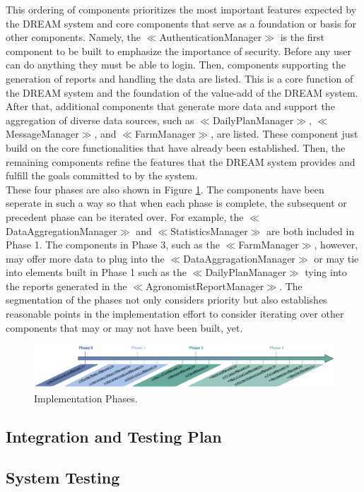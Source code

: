 \begin{flushleft}
This ordering of components prioritizes the most important features expected by the DREAM system and core components that serve as a foundation or basis for other components. Namely, the \(\ll\)AuthenticationManager\(\gg\) is the first component to be built to emphasize the importance of security. Before any user can do anything they must be able to login. Then, components supporting the generation of reports and handling the data are listed. This is a core function of the DREAM system and the foundation of the value-add of the DREAM system. After that, additional components that generate more data and support the aggregation of diverse data sources, such as \(\ll\)DailyPlanManager\(\gg\), \(\ll\)MessageManager\(\gg\), and \(\ll\)FarmManager\(\gg\), are listed. These component just build on the core functionalities that have already been established. Then, the remaining components refine the features that the DREAM system provides and fulfill the goals committed to by the system. \\
\smallskip
These four phases are also shown in Figure \ref{fig:implementationPhases}. The components have been seperate in such a way so that when each phase is complete, the subsequent or precedent phase can be iterated over. For example, the \(\ll\)DataAggregationManager\(\gg\) and \(\ll\)StatisticsManager\(\gg\) are both included in Phase 1. The components in Phase 3, such as the \(\ll\)FarmManager\(\gg\), however, may offer more data to plug into the \(\ll\)DataAggragationManager\(\gg\) or may tie into elements built in Phase 1 such as the \(\ll\)DailyPlanManager\(\gg\) tying into the reports generated in the \(\ll\)AgronomistReportManager\(\gg\). The segmentation of the phases not only considers priority but also establishes reasonable points in the implementation effort to consider iterating over other components that may or may not have been built, yet. 
\end{flushleft}

\begin{figure}[hbt!]
\centering
\includegraphics[width=\textwidth]{../images_diagrams/dd/implementation_phases.png}
\caption{Implementation Phases.}
\label{fig:implementationPhases}
\end{figure}


\subsection{Integration and Testing Plan}
\subsection{System Testing}